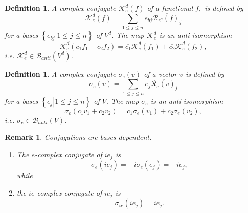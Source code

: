 \documentclass[aps,preprint]{revtex4}%
\newtheorem{definition}[theorem]{Definition}
\newtheorem{remark}[theorem]{Remark}
\begin{document}
\begin{definition}
A complex conjugate $\mathcal{K}_{e}^{d}\left(  f\right)  $ of a functional
$f,$ is defined by
\begin{equation}
\mathcal{K}_{e}^{d}\left(  f\right)  =\sum_{1\leq j\leq n}e_{bj}%
\overline{\mathcal{R}_{e^{d}}\left(  f\right)  _{j}}%
\end{equation}
for a bases $\left\{  \left.  e_{bj}\right\vert 1\leq j\leq n\right\}  $ of
$V^{d}$. The map $\mathcal{K}_{e}^{d}$ is an anti isomorphism%
\begin{equation}
\mathcal{K}_{e}^{d}\left(  c_{1}f_{1}+c_{2}f_{2}\right)  =\overline{c_{1}%
}\mathcal{K}_{e}^{d}\left(  f_{1}\right)  +\overline{c_{2}}\mathcal{K}_{e}%
^{d}\left(  f_{2}\right)  ,
\end{equation}
i.e. $\mathcal{K}_{e}^{d}\in\mathcal{B}_{anti}\left(  V^{d}\right)  $.
\end{definition}

\begin{definition}
A \emph{c}omplex conjugate $\mathcal{\sigma}_{e}\left(  v\right)  $ of
\emph{a} vector $v$ \emph{is }defined by
\begin{equation}
\mathcal{\sigma}_{e}\left(  v\right)  =\sum_{1\leq j\leq n}e_{j}%
\overline{\mathcal{R}_{e}\left(  v\right)  _{j}}%
\end{equation}
for a bases $\left\{  \left.  e_{j}\right\vert 1\leq j\leq n\right\}  $ of
$V.$ The map $\mathcal{\sigma}_{e}$ is an anti isomorphism%
\begin{equation}
\mathcal{\sigma}_{e}\left(  c_{1}v_{1}+c_{2}v_{2}\right)  =\overline{c_{1}%
}\mathcal{\sigma}_{e}\left(  v_{1}\right)  +\overline{c_{2}}\mathcal{\sigma
}_{e}\left(  v_{2}\right)  ,
\end{equation}
i.e. $\mathcal{\sigma}_{e}\in\mathcal{B}_{anti}\left(  V\right)  .$
\end{definition}

\begin{remark}
Conjugations are \emph{bases dependent.}

\begin{enumerate}
\item The $e$-complex conjugate of $ie_{j}$ is
\begin{equation}
\mathcal{\sigma}_{e}\left(  ie_{j}\right)  =-i\mathcal{\sigma}_{e}\left(
e_{j}\right)  =-ie_{j},
\end{equation}
while

\item the $ie$-complex conjugate of $ie_{j}$ is
\[
\mathcal{\sigma}_{ie}\left(  ie_{j}\right)  =ie_{j}.
\]

\end{enumerate}
\end{remark}
\end{document}
